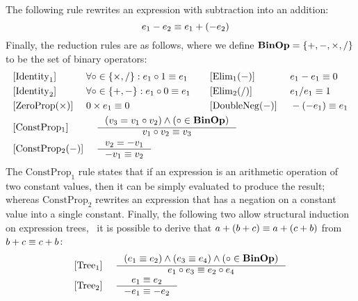 The following rule rewrites an expression with subtraction into an addition:
\begin{equation}
    [\mathrm{Subtract}] \quad
    e_1 - e_2 \eqrel e_1 + (-e_2)
\end{equation}
Finally, the reduction rules are as follows, where we define $\mathbf{BinOp} = \{ +,
-, \times, / \}$ to be the set of binary operators:
\begin{equation}
    \begin{aligned} &
        \begin{aligned}{}
            & [\mathrm{Identity}_1] &~&
                \forall \circ \in \{ \times, / \}:
                e_1 \circ 1 \eqrel e_1
                & \quad
            & [\mathrm{Elim}_1 (-)] &~&
                e_1 - e_1 \eqrel 0
                \\
            & [\mathrm{Identity}_2] &~&
                \forall \circ \in \{ +, - \}:
                e_1 \circ 0 \eqrel e_1
                & \quad
            & [\mathrm{Elim}_2 (/)] &~&
                e_1 / e_1 \eqrel 1
                \\
            & [\mathrm{ZeroProp} (\times)] &~&
                0 \times e_1 \eqrel 0
                & \quad
            & [\mathrm{DoubleNeg} (-)] &~&
                -(-e_1) \eqrel e_1
                \\
        \end{aligned} \\ &
        \begin{aligned}{}
            & [\mathrm{ConstProp_1}] &~&
            \inference{%
                (v_3 = v_1 \circ v_2) \wedge
                (\circ \in \binopset)
            }{%
                v_1 \circ v_2 \eqrel v_3
            } \\
            & [\mathrm{ConstProp_2} (-)] &~&
            \inference{%
                v_2 = -v_1
            }{%
                -v_1 \eqrel v_2
            }
        \end{aligned}
    \end{aligned}
    \label{so:eq:equivalence_reduction}
\end{equation}
The $\mathrm{ConstProp}_1$ rule states that if an expression is an arithmetic
operation of two constant values, then it can be simply evaluated to produce
the result; whereas $\mathrm{ConstProp}_2$ rewrites an expression that has a
negation on a constant value into a single constant. Finally, the following two
allow structural induction on expression trees, \eg~it is possible to derive
that $a + (b + c) \equiv a + (c + b)$ from $b + c \equiv c + b$:
\begin{equation}
    \begin{aligned}
        & [\mathrm{Tree}_1] &~&
        \inference{%
            \left( e_1 \eqrel e_2 \right) \wedge
            \left( e_3 \eqrel e_4 \right) \wedge
            \left( \circ \in \binopset \right)
        }{%
            e_1 \circ e_3 \eqrel e_2 \circ e_4
        } \\
        & [\mathrm{Tree}_2] &~&
        \inference{%
            e_1 \eqrel e_2
        }{%
            -e_1 \eqrel -e_2
        }
    \end{aligned}
    \label{so:eq:equivalence_tree}
\end{equation}

